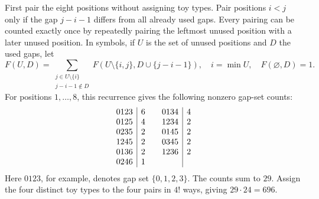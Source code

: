 First pair the eight positions without assigning toy types. Pair positions $i<j$ only if the gap $j-i-1$ differs from all already used gaps. Every pairing can be counted exactly once by repeatedly pairing the leftmost unused position with a later unused position. In symbols, if $U$ is the set of unused positions and $D$ the used gaps, let
\[F(U,D)=\sum_{\substack{j\in U\setminus\{i\}\\j-i-1\notin D}}F(U\setminus\{i,j\},D\cup\{j-i-1\}),\quad i=\min U,\quad F(\varnothing,D)=1.\]
For positions $1,\ldots,8$, this recurrence gives the following nonzero gap-set counts:
\[\begin{array}{c|r@{\qquad}c|r}0123&6&0134&4\\0125&4&1234&2\\0235&2&0145&2\\1245&2&0345&2\\0136&2&1236&2\\0246&1&&\end{array}\]
Here $0123$, for example, denotes gap set $\{0,1,2,3\}$. The counts sum to $29$. Assign the four distinct toy types to the four pairs in $4!$ ways, giving $\boxed{29\cdot24=696}$.
